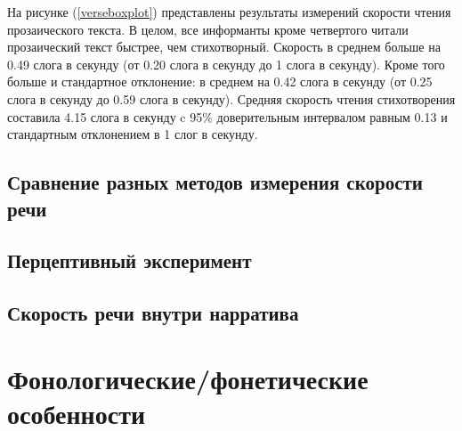 \par На рисунке (\ref{verseboxplot}) представлены результаты измерений скорости чтения прозаического текста. В целом, все информанты кроме четвертого читали прозаический текст быстрее, чем стихотворный. Скорость в среднем больше на 0.49 слога в секунду (от 0.20 слога в секунду до 1 слога в секунду). Кроме того больше и стандартное отклонение: в среднем на 0.42 слога в секунду (от 0.25 слога в секунду до 0.59 слога в секунду). Средняя скорость чтения стихотворения составила 4.15 слога в секунду c 95\% доверительным интервалом равным 0.13 и стандартным отклонением в 1 слог в секунду.
\subsection{Сравнение разных методов измерения скорости речи}
\subsection{Перцептивный эксперимент}
\subsection{Скорость речи внутри нарратива}
\pagebreak
\section{Фонологические/фонетические особенности}
